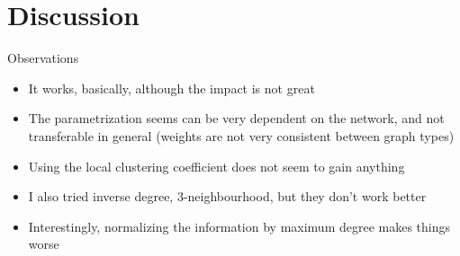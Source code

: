 \documentclass{beamer}
\begin{document}
\section{Discussion}
\begin{frame}{Observations\footnotemark}
  \begin{itemize}
  \item It works, basically, although the impact is not great
  \item The parametrization seems can be very dependent on the network, and not transferable in
    general (weights are not very consistent between graph types)
  \item Using the local clustering coefficient does not seem to gain anything
  \item I also tried inverse degree, 3-neighbourhood, but they don't work better
  \item Interestingly, normalizing the information by maximum degree makes things worse
  \end{itemize}
\end{frame}


\end{document}
